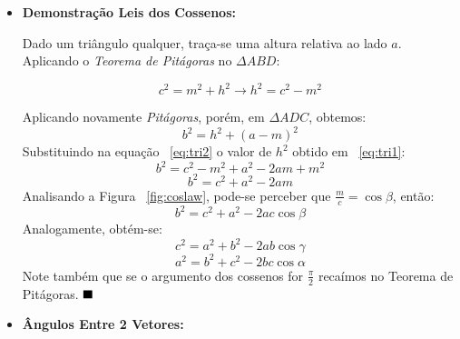 \documentclass[a4paper,12pt]{article}
\begin{document}
	\begin{itemize}
		\item \textbf{Demonstração Leis dos Cossenos:}
		
		Dado um triângulo qualquer, traça-se uma altura relativa ao lado $a$. Aplicando o \textit{Teorema de Pitágoras} no $\Delta ABD$:
		
		\begin{equation}
		c^{2}=m^{2}+h^{2} \rightarrow h^{2}=c^{2}-m^{2}
		\label{eq:tri1}
		\end{equation}
		
		Aplicando novamente \textit{Pitágoras}, porém, em $\Delta ADC$, obtemos:
		\begin{equation}
		b^{2}=h^{2}+(a-m)^{2}
		\label{eq:tri2}
		\end{equation}
		Substituindo na equação ~\ref{eq:tri2} o valor de $h^{2}$ obtido em ~\ref{eq:tri1}:
		$$
		b^{2}=c^{2}-m^{2}+a^{2}-2am+m^{2}
		$$
		$$
		b^{2}=c^{2}+a^{2}-2am
		$$
		Analisando a 
		Figura ~\ref{fig:coslaw}, pode-se perceber que $\frac{m}{c}=\cos\beta$, então:
		$$
		b^{2}=c^{2}+a^{2}-2ac\cos\beta
		$$
		Analogamente, obtém-se:
		$$
		c^{2}=a^{2}+b^{2}-2ab\cos\gamma
		$$
		$$
		a^{2}=b^{2}+c^{2}-2bc\cos\alpha
		$$
		Note também que se o argumento dos cossenos for $\frac{\pi}{2}$ recaímos no Teorema de Pitágoras. $\hfill\blacksquare$
		\item \textbf{Ângulos Entre 2 Vetores:}
		

\end{itemize}
\end{document}
